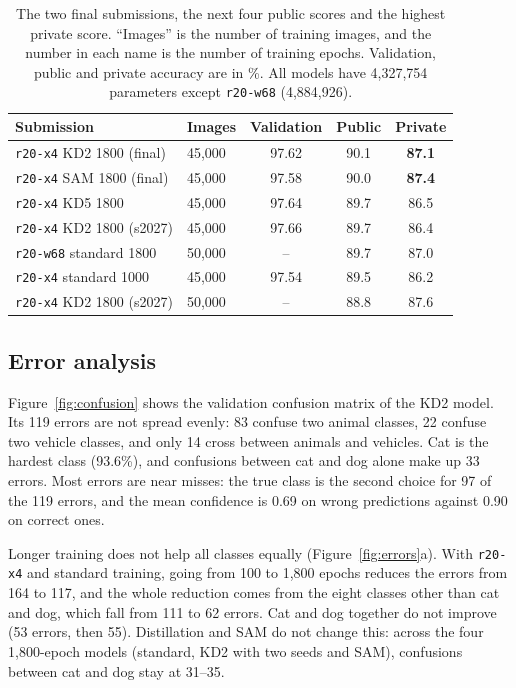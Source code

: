 \documentclass[letterpaper]{article}
\begin{document}
\begin{table}[t]
\centering
\footnotesize
\setlength{\tabcolsep}{1.9pt}
\begin{tabular}{@{}llccc@{}}
\toprule
Submission & Images & Validation & Public & Private \\
\midrule
\texttt{r20-x4} KD2 1800 (final) & 45,000 & 97.62 & 90.1 & \textbf{87.1} \\
\texttt{r20-x4} SAM 1800 (final) & 45,000 & 97.58 & 90.0 & \textbf{87.4} \\
\texttt{r20-x4} KD5 1800 & 45,000 & 97.64 & 89.7 & 86.5 \\
\texttt{r20-x4} KD2 1800 (s2027) & 45,000 & 97.66 & 89.7 & 86.4 \\
\texttt{r20-w68} standard 1800 & 50,000 & -- & 89.7 & 87.0 \\
\texttt{r20-x4} standard 1000 & 45,000 & 97.54 & 89.5 & 86.2 \\
\texttt{r20-x4} KD2 1800 (s2027) & 50,000 & -- & 88.8 & 87.6 \\
\bottomrule
\end{tabular}
\caption{The two final submissions, the next four public scores and the highest private score. ``Images'' is the number of training
images, and the number in each name is the number of training epochs. Validation, public and private accuracy are in \%. All models have 4,327,754 parameters except \texttt{r20-w68} (4,884,926).}
\label{tab:final}
\end{table}

\subsection{Error analysis}
\label{sec:errors}
Figure~\ref{fig:confusion} shows the validation confusion matrix of the KD2 model. Its 119 errors are not spread evenly: 83 confuse
two animal classes, 22 confuse two vehicle classes, and only 14 cross between animals and vehicles. Cat is the hardest class
(93.6\%), and confusions between cat and dog alone make up 33 errors. Most errors are near misses: the true class is the second choice
for 97 of the 119 errors, and the mean confidence is 0.69 on wrong predictions against 0.90 on correct ones.

Longer training does not help all classes equally (Figure~\ref{fig:errors}a). With \texttt{r20-x4} and standard training, going from
100 to 1,800 epochs reduces the errors from 164 to 117, and the whole reduction comes from the eight classes other than cat and dog,
which fall from 111 to 62 errors. Cat and dog together do not improve (53 errors, then 55). Distillation and SAM do not change this:
across the four 1,800-epoch models (standard, KD2 with two seeds and SAM), confusions between cat and dog stay at 31--35.
\end{document}
